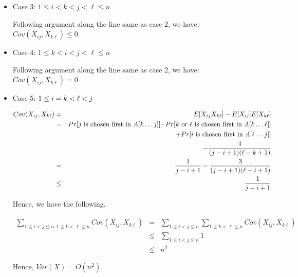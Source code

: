\documentclass[11pt]{article}
\begin{document}
\begin{enumerate}
\begin{itemize}
 \item Case 3: $1\le i<k<j<\ell\le n$
 
 Following argument along the line same as case 2, we have: $Cov(X_{ij}, X_{k\ell}) \le 0$.
 
 \item Case 4: $1\le k<i<j<\ell\le n$
 
 Following argument along the line same as case 2, we have: $Cov(X_{ij}, X_{k\ell}) = 0$.
 
 \item Case 5: $1\le i=k<\ell<j$
 
 \begin{eqnarray*}
  Cov(X_{ij}, X_{k\ell}) &=& E[X_{ij}X_{k\ell}] - E[X_{ij}]E[X_{k\ell}]\\
  &=& Pr[j \text{ is chosen first in } A[k\ldots j]]\cdot Pr[k \text{ or } \ell \text{ is chosen first in } A[k\ldots \ell]]\\
  && + Pr[i \text{ is chosen first in } A[i\ldots j]]\\
  && - \frac{4}{(j-i+1)(\ell-k+1)}\\
  &=& \frac{1}{j-i+1} - \frac{3}{(j-i+1)(\ell-i+1)}\\
  &\le& \frac{1}{j-i+1}
 \end{eqnarray*}
 
 Hence, we have the following.
 
 \begin{eqnarray*}
  \sum_{1\le i<j\le n,1\le k<\ell\le n} Cov(X_{ij}, X_{k\ell}) &=& \sum_{1\le i<j\le n} \sum_{1\le k<\ell\le n} Cov(X_{ij}, X_{k\ell})\\
  &\le& \sum_{1\le i<j\le n} 1\\
  &\le& n^2
 \end{eqnarray*}

 Hence, $Var(X) = O(n^2)$.

\end{itemize}



\end{enumerate}
\end{document}
